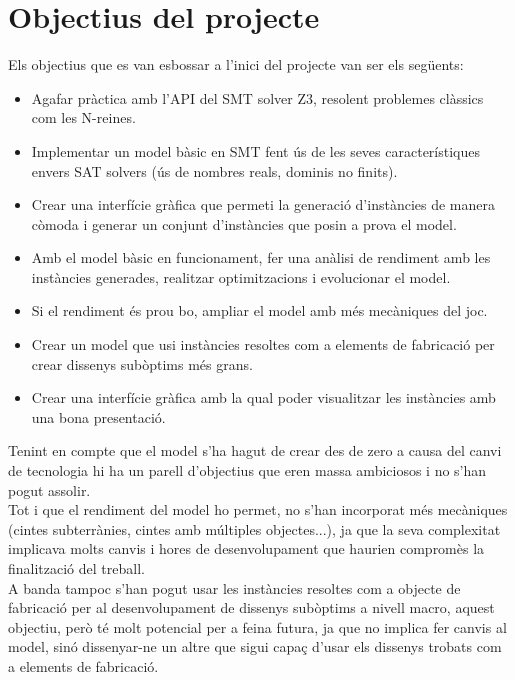 \section{Objectius del projecte}
Els objectius que es van esbossar a l'inici del projecte van ser els següents:
\begin{itemize}
    \item Agafar pràctica amb l'API del SMT solver Z3, resolent problemes clàssics com les N-reines.
    \item Implementar un model bàsic en SMT fent ús de les seves característiques envers SAT solvers (ús de nombres reals, dominis no finits).
    \item Crear una interfície gràfica que permeti la generació d'instàncies de manera còmoda i generar un conjunt d'instàncies que posin a prova el model.
    \item Amb el model bàsic en funcionament, fer una anàlisi de rendiment amb les instàncies generades, realitzar optimitzacions i evolucionar el model.
    \item Si el rendiment és prou bo, ampliar el model amb més mecàniques del joc.
    \item Crear un model que usi instàncies resoltes com a elements de fabricació per crear dissenys subòptims més grans.
    \item Crear una interfície gràfica amb la qual poder visualitzar les instàncies amb una bona presentació.
\end{itemize}

Tenint en compte que el model s'ha hagut de crear des de zero a causa del canvi de tecnologia hi ha un parell d'objectius que eren massa ambiciosos i no s'han pogut assolir.\\ Tot i que el rendiment del model ho permet, no s'han incorporat més mecàniques (cintes subterrànies, cintes amb múltiples objectes...), ja que la seva complexitat implicava molts canvis i hores de desenvolupament que haurien compromès la finalització del treball.\\ A banda tampoc s'han pogut usar les instàncies resoltes com a objecte de fabricació per al desenvolupament de dissenys subòptims a nivell macro, aquest objectiu, però té molt potencial per a feina futura, ja que no implica fer canvis al model, sinó dissenyar-ne un altre que sigui capaç d'usar els dissenys trobats com a elements de fabricació.